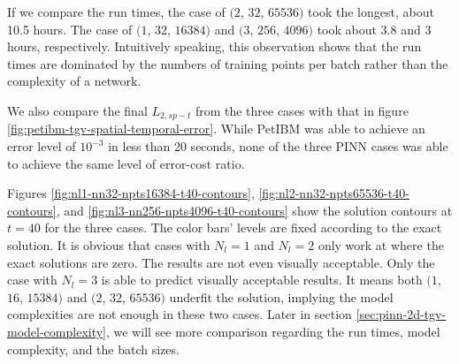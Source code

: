 If we compare the run times, the case of $(2$, $32$, $65536)$ took the longest, about 10.5 hours.
The case of $(1$, $32$, $16384)$ and $(3$, $256$, $4096)$ took about 3.8 and 3 hours, respectively.
Intuitively speaking, this observation shows that the run times are dominated by the numbers of training points per batch rather than the complexity of a network.

We also compare the final $L_{2,sp-t}$ from the three cases with that in figure \ref{fig:petibm-tgv-spatial-temporal-error}.
While PetIBM was able to achieve an error level of $10^{-3}$ in less than 20 seconds, none of the three PINN cases was able to achieve the same level of error-cost ratio.

Figures \ref{fig:nl1-nn32-npts16384-t40-contours}, \ref{fig:nl2-nn32-npts65536-t40-contours}, and \ref{fig:nl3-nn256-npts4096-t40-contours} show the solution contours at $t=40$ for the three cases.
The color bars' levels are fixed according to the exact solution.
It is obvious that cases with $N_l=1$ and $N_l=2$ only work at where the exact solutions are zero.
The results are not even visually acceptable.
Only the case with $N_l=3$ is able to predict visually acceptable results.
It means both $(1$, $16$, $15384)$ and $(2$, $32$, $65536)$ underfit the solution, implying the model complexities are not enough in these two cases.
Later in section \ref{sec:pinn-2d-tgv-model-complexity}, we will see more comparison regarding the run times, model complexity, and the batch sizes.
